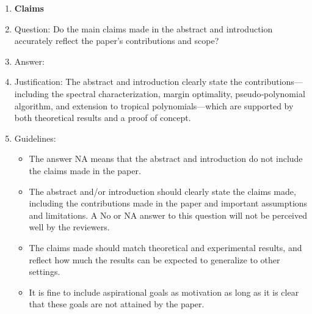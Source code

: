 \documentclass{article}
\begin{document}
\begin{enumerate}

\item {\bf Claims}
    \item[] Question: Do the main claims made in the abstract and introduction accurately reflect the paper's contributions and scope?
    \item[] Answer: \answerYes{}
    \item[] Justification: The abstract and introduction clearly state the contributions—including the spectral characterization, margin optimality, pseudo‐polynomial algorithm, and extension to tropical polynomials—which are supported by both theoretical results and a proof of concept.
    \item[] Guidelines:
    \begin{itemize}
        \item The answer NA means that the abstract and introduction do not include the claims made in the paper.
        \item The abstract and/or introduction should clearly state the claims made, including the contributions made in the paper and important assumptions and limitations. A No or NA answer to this question will not be perceived well by the reviewers. 
        \item The claims made should match theoretical and experimental results, and reflect how much the results can be expected to generalize to other settings. 
        \item It is fine to include aspirational goals as motivation as long as it is clear that these goals are not attained by the paper. 
    \end{itemize}


\end{enumerate}
\end{document}
